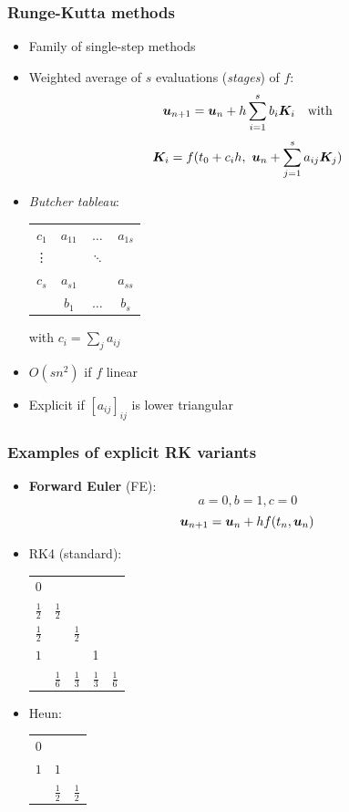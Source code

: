 \documentclass{beamer}
\begin{document}
\begin{frame} %
	\frametitle{Runge-Kutta methods}
	\begin{itemize}
		\item Family of single-step methods
		\item Weighted average of $s$ evaluations (\textit{stages}) of $f$:
		$$ \boldsymbol u_{n+1} = \boldsymbol u_{n} + h \sum_{i=1}^s b_i \boldsymbol K_i \quad \text{with} $$
		\vspace{-6pt}
		$$ \boldsymbol K_i = f(t_0 + c_i h, \ \boldsymbol u_n + \sum_{j=1}^s a_{ij} \boldsymbol K_j) $$
		\pause
		\item \textit{Butcher tableau}:
		\begin{center}
			\begin{tabular}{c|ccc}
				$c_1$ & $a_{11}$ & $\dots$ & $a_{1s}$ \\
				\vdots & & $\ddots$ & \\
				$c_s$ & $a_{s1}$ & & $a_{ss}$ \\
				\hline
				& $b_1$ & $\dots$ & $b_s$
			\end{tabular}
		with $c_i = \sum_j a_{ij}$
		\pause
		\end{center}
		\item $O(s n^2)$ if $f$ linear
		\item Explicit if $[a_{ij}]_{ij}$ is lower triangular
	\end{itemize}
\end{frame}


\begin{frame} %
	\frametitle{Examples of explicit RK variants}
	\begin{itemize}
		\item \textbf{Forward Euler} (FE):
		$$ a = 0, b = 1, c = 0 $$
		$$ \boldsymbol u_{n+1} = \boldsymbol u_{n} + h f(t_n, \boldsymbol u_n) $$
		\item RK4 (standard):
		\begin{tabular}{c|cccc}
			$0$ & & & & \\
			$\frac 1 2$ & $\frac 1 2$ & & & \\
			$\frac 1 2$ & & $\frac 1 2$ & & \\
			$1$ & & & 1 & \\
			\hline
			& $\frac 1 6$ & $\frac 1 3$ & $\frac 1 3$ & $\frac 1 6$
			\end{tabular}
		\item Heun:
		\begin{tabular}{c|cc}
			$0$ &     & \\
			$1$ & $1$ & \\
			\hline
			    & $\frac 1 2$ & $\frac 1 2$
			\end{tabular}	
	\end{itemize}
\end{frame}
\end{document}
